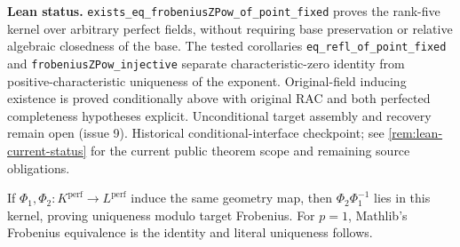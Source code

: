 \documentclass[11pt,oneside]{article}
\theoremstyle{definition}
\theoremstyle{remark}
\newcommand{\lean}[1]{\nolinkurl{#1}}
\begin{document}
\noindent\textbf{Lean status.}
\lean{exists_eq_frobeniusZPow_of_point_fixed} proves the rank-five kernel over
arbitrary perfect fields, without requiring base preservation or relative algebraic
closedness of the base. The tested corollaries \lean{eq_refl_of_point_fixed} and
\lean{frobeniusZPow_injective} separate characteristic-zero identity from
positive-characteristic uniqueness of the exponent. Original-field inducing
existence is proved conditionally above with original RAC and both perfected
completeness hypotheses explicit. Unconditional target assembly and
recovery remain open (issue 9).
Historical conditional-interface checkpoint; see \cref{rem:lean-current-status} for
the current public theorem scope and remaining source obligations.

If $\Phi_1,\Phi_2:K^{\mathrm{perf}}\to L^{\mathrm{perf}}$ induce the same geometry map,
then $\Phi_2\Phi_1^{-1}$ lies in this kernel, proving uniqueness modulo target Frobenius.
For $p=1$, Mathlib's Frobenius equivalence is the identity and literal uniqueness follows.
\end{document}
